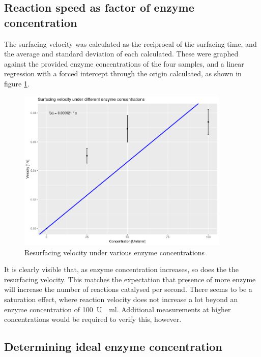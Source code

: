\documentclass[a4paper,english]{scrreprt}
\begin{document}
\subsection{Reaction speed as factor of enzyme concentration}

The surfacing velocity was calculated as the reciprocal of the surfacing time,
and the average and standard deviation of each calculated. These were graphed
against the provided enzyme concentrations of the four samples, and a linear
regression with a forced intercept through the origin calculated, as shown in
figure \ref{fig:enzyme_optimal_concentration}.

\begin{figure}
	\centering
	\includegraphics[width=0.9\textwidth]{img/optimal_concentration.png}
	\caption{Resurfacing velocity under various enzyme concentrations}
	\label{fig:enzyme_optimal_concentration}
\end{figure}

It is clearly visible that, as enzyme concentration increases, so does the the
resurfacing velocity. This matches the expectation that presence of more enzyme
will increase the number of reactions catalysed per second. There seems to be a
saturation effect, where reaction velocity does not increase a lot beyond an
enzyme concentration of \SI{100}{U \per \ml}. Additional measurements at higher
concentrations would be required to verify this, however.

\subsection{Determining ideal enzyme concentration}
\end{document}
